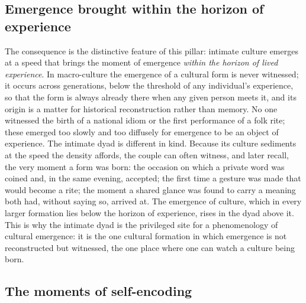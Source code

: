\subsection*{Emergence brought within the horizon of experience}

The consequence is the distinctive feature of this pillar: intimate culture emerges at a speed that brings the moment of emergence \emph{within the horizon of lived experience}. In macro-culture the emergence of a cultural form is never witnessed; it occurs across generations, below the threshold of any individual's experience, so that the form is always already there when any given person meets it, and its origin is a matter for historical reconstruction rather than memory. No one witnessed the birth of a national idiom or the first performance of a folk rite; these emerged too slowly and too diffusely for emergence to be an object of experience. The intimate dyad is different in kind. Because its culture sediments at the speed the density affords, the couple can often witness, and later recall, the very moment a form was born: the occasion on which a private word was coined and, in the same evening, accepted; the first time a gesture was made that would become a rite; the moment a shared glance was found to carry a meaning both had, without saying so, arrived at. The emergence of culture, which in every larger formation lies below the horizon of experience, rises in the dyad above it. This is why the intimate dyad is the privileged site for a phenomenology of cultural emergence: it is the one cultural formation in which emergence is not reconstructed but witnessed, the one place where one can watch a culture being born.

\subsection*{The moments of self-encoding}

